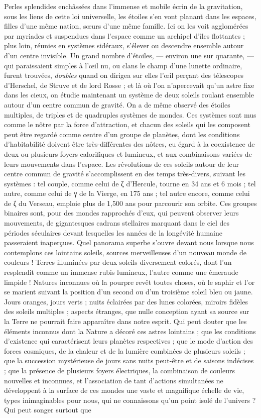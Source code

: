 \documentclass[a4paper, 11pt, oneside, landscape]{article}
\begin{document}
Perles splendides enchâssées dans l'immense et mobile écrin de la gravitation, sous les liens de cette loi universelle, les étoiles s'en vont planant dans les espaces, filles d'une même nation, sœurs d'une même famille. Ici on les voit agglomérées par myriades et suspendues dans l'espace comme un archipel d'îles flottantes ; plus loin, réunies en systèmes sidéraux, s'élever ou descendre ensemble autour d'un centre invisible. Un grand nombre d'étoiles, --- environ une sur quarante, --- qui paraissaient simples à l'œil nu, ou clans le champ d'une lunette ordinaire, furent trouvées, \emph{doubles} quand on dirigea sur elles l'œil perçant des télescopes d'Herschel, de Struve et de lord Rosse ; et là où l'on n'apercevait qu'un astre fixe dans les cieux, on étudie maintenant un système de deux soleils roulant ensemble autour d'un centre commun de gravité. On a de même observé des étoiles multiples, de triples et de quadruples systèmes de mondes. Ces systèmes sont mus comme le nôtre par la force d'attraction, et chacun des soleils qui les composent peut être regardé comme centre d'un groupe de planètes, dont les conditions d'habitabilité doivent être très-différentes des nôtres, eu égard à la coexistence de deux ou plusieurs foyers calorifiques et lumineux, et aux combinaisons variées de leurs mouvements dans l'espace. Les révolutions de ces soleils autour de leur centre commun de gravité s'accomplissent en des temps très-divers, suivant les systèmes : tel couple, comme celui de ζ d'Hercule, tourne en 34 ans et 6 mois ; tel autre, comme celui de γ de la Vierge, en 175 ans ; tel autre encore, comme celui de ζ du Verseau, emploie plus de 1,500 ans pour parcourir son orbite. Ces groupes binaires sont, pour des mondes rapprochés d'eux, qui peuvent observer leurs mouvements, de gigantesques cadrans stellaires marquant dans le ciel des périodes séculaires devant lesquelles les années de la longévité humaine passeraient inaperçues. Quel panorama superbe s'ouvre devant nous lorsque nous contemplons ces lointains soleils, sources merveilleuses d'un nouveau monde de couleurs ! Terres illuminées par deux soleils diversement colorés, dont l'un resplendit comme un immense rubis lumineux, l'autre comme une émeraude limpide ! Natures inconnues où la pourpre revêt toutes choses, où le saphir et l'or se marient suivant la position d'un second ou d'un troisième soleil bleu ou jaune. Jours oranges, jours verts ; nuits éclairées par des lunes colorées, miroirs fidèles des soleils multiples ; aspects étranges, que nulle conception ayant sa source sur la Terre ne pourrait faire apparaître dans notre esprit. Qui peut douter que les éléments inconnus dont la Nature a décoré ces astres lointains ; que les conditions d'existence qui caractérisent leurs planètes respectives ; que le mode d'action des forces cosmiques, de la chaleur et de la lumière combinées de plusieurs soleils ; que la succession mystérieuse de jours sans nuits peut-être et de saisons indécises ; que la présence de plusieurs foyers électriques, la combinaison de couleurs nouvelles et inconnues, et l'association de tant d'actions simultanées ne développent à la surface de ces mondes une vaste et magnifique échelle de vie, types inimaginables pour nous, qui ne connaissons qu'un point isolé de l'univers ? Qui peut songer surtout que 
\end{document}
